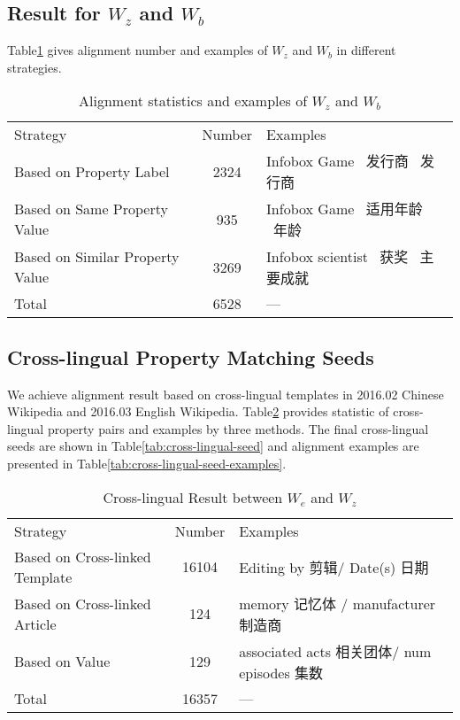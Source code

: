 \documentclass[runningheads,a4paper]{llncs}
\begin{document}
\subsection{Result for $W_z$ and $W_b$}
Table\ref{tab:zhwiki-baidu-cross-lingual} gives alignment number and examples of $W_z$ and $W_b$ in different strategies.

\begin{table}[htb]
  \centering
  \caption{Alignment statistics and examples of $W_z$ and $W_b$}
  \label{tab:zhwiki-baidu-cross-lingual}
    \begin{tabular}{lcl}
      {Strategy} & {Number} &  {Examples} \\
      Based on Property Label & 2324 & Infobox Game \  发行商  \ 发行商  \\
      Based on Same Property Value & 935  & Infobox Game \  适用年龄 \   年龄 \\
      Based on Similar Property Value & 3269 & Infobox scientist \ 获奖 \   主要成就  \\
      Total           & 6528 & —  \\
    \end{tabular}
\end{table}

\subsection{Cross-lingual Property Matching Seeds}
We achieve alignment result based on cross-lingual templates in 2016.02 Chinese Wikipedia and 2016.03 English Wikipedia. Table\ref{tab:zhwiki-enwiki-cross-lingual} provides statistic of cross-lingual property pairs and examples by three methods. The final cross-lingual seeds are shown in Table\ref{tab:cross-lingual-seed} and alignment examples are presented in Table\ref{tab:cross-lingual-seed-examples}.

\begin{table}[htb]
  \centering
  \caption{Cross-lingual Result between $W_e$ and $W_z$}
  \label{tab:zhwiki-enwiki-cross-lingual}
    \begin{tabular}{lcl}
      {Strategy} & {Number} &  {Examples} \\
      Based on Cross-linked Template & 16104 & Editing by  剪辑/ Date(s) 日期   \\
      Based on Cross-linked Article & 124   & memory 记忆体 / manufacturer 制造商\\
      Based on Value     & 129   & associated acts 相关团体/ num episodes 集数  \\
      Total               & 16357 & —  \\
    \end{tabular}
\end{table}
\end{document}
